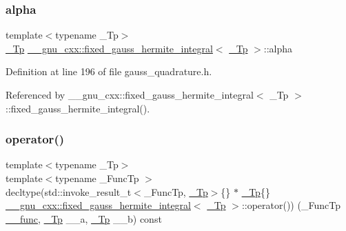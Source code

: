 \subsubsection{\texorpdfstring{alpha}{alpha}}
{\footnotesize\ttfamily template$<$typename \+\_\+\+Tp$>$ \\
\hyperlink{namespace____gnu__cxx_a3b19a9c800ca194374ef9172290f7d79}{\+\_\+\+Tp} \hyperlink{struct____gnu__cxx_1_1fixed__gauss__hermite__integral}{\+\_\+\+\_\+gnu\+\_\+cxx\+::fixed\+\_\+gauss\+\_\+hermite\+\_\+integral}$<$ \hyperlink{namespace____gnu__cxx_a3b19a9c800ca194374ef9172290f7d79}{\+\_\+\+Tp} $>$\+::alpha}



Definition at line 196 of file gauss\+\_\+quadrature.\+h.



Referenced by \+\_\+\+\_\+gnu\+\_\+cxx\+::fixed\+\_\+gauss\+\_\+hermite\+\_\+integral$<$ \+\_\+\+Tp $>$\+::fixed\+\_\+gauss\+\_\+hermite\+\_\+integral().

\mbox{\label{struct____gnu__cxx_1_1fixed__gauss__hermite__integral_a9d7212ceef93046f59568b551e9eef1e}} 
\subsubsection{\texorpdfstring{operator()}{operator()}}
{\footnotesize\ttfamily template$<$typename \+\_\+\+Tp$>$ \\
template$<$typename \+\_\+\+Func\+Tp $>$ \\
decltype(std\+::invoke\+\_\+result\+\_\+t$<$\+\_\+\+Func\+Tp, \hyperlink{namespace____gnu__cxx_a3b19a9c800ca194374ef9172290f7d79}{\+\_\+\+Tp}$>$\{\} $\ast$ \hyperlink{namespace____gnu__cxx_a3b19a9c800ca194374ef9172290f7d79}{\+\_\+\+Tp}\{\} \hyperlink{struct____gnu__cxx_1_1fixed__gauss__hermite__integral}{\+\_\+\+\_\+gnu\+\_\+cxx\+::fixed\+\_\+gauss\+\_\+hermite\+\_\+integral}$<$ \hyperlink{namespace____gnu__cxx_a3b19a9c800ca194374ef9172290f7d79}{\+\_\+\+Tp} $>$\+::operator()) (\+\_\+\+Func\+Tp \hyperlink{namespace____gnu__cxx_af2b2f0c7a2ae72b922b1afefae5a65b2}{\+\_\+\+\_\+func}, \hyperlink{namespace____gnu__cxx_a3b19a9c800ca194374ef9172290f7d79}{\+\_\+\+Tp} \+\_\+\+\_\+a, \hyperlink{namespace____gnu__cxx_a3b19a9c800ca194374ef9172290f7d79}{\+\_\+\+Tp} \+\_\+\+\_\+b) const}



